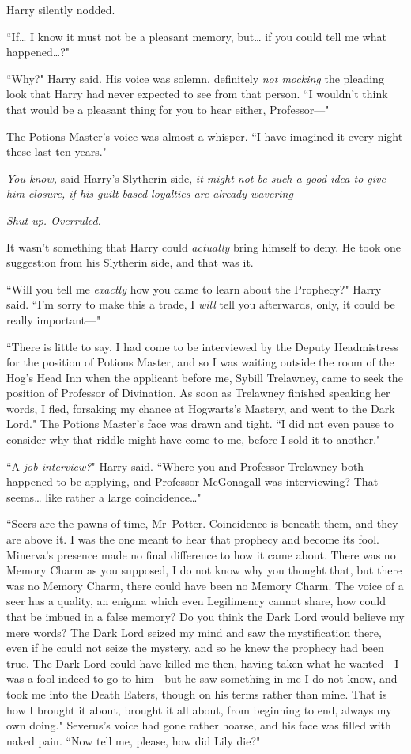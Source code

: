 Harry silently nodded.

``If{\ldots} I know it must not be a pleasant memory, but{\ldots} if you could tell me what happened{\ldots}?"

``Why?" Harry said. His voice was solemn, definitely \emph{not mocking} the pleading look that Harry had never expected to see from that person. ``I wouldn't think that would be a pleasant thing for you to hear either, Professor—"

The Potions Master's voice was almost a whisper. ``I have imagined it every night these last ten years."

\emph{You know,} said Harry's Slytherin side, \emph{it might not be such a good idea to give him closure, if his guilt-based loyalties are already wavering—}

\emph{Shut up. Overruled.}

It wasn't something that Harry could \emph{actually} bring himself to deny. He took one suggestion from his Slytherin side, and that was it.

``Will you tell me \emph{exactly} how you came to learn about the Prophecy?" Harry said. ``I'm sorry to make this a trade, I \emph{will} tell you afterwards, only, it could be really important—"

``There is little to say. I had come to be interviewed by the Deputy Headmistress for the position of Potions Master, and so I was waiting outside the room of the Hog's Head Inn when the applicant before me, Sybill Trelawney, came to seek the position of Professor of Divination. As soon as Trelawney finished speaking her words, I fled, forsaking my chance at Hogwarts's Mastery, and went to the Dark Lord." The Potions Master's face was drawn and tight. ``I did not even pause to consider why that riddle might have come to me, before I sold it to another."

``A \emph{job interview?}" Harry said. ``Where you and Professor Trelawney both happened to be applying, and Professor McGonagall was interviewing? That seems{\ldots} like rather a large coincidence{\ldots}"

``Seers are the pawns of time, Mr~Potter. Coincidence is beneath them, and they are above it. I was the one meant to hear that prophecy and become its fool. Minerva's presence made no final difference to how it came about. There was no Memory Charm as you supposed, I do not know why you thought that, but there was no Memory Charm, there could have been no Memory Charm. The voice of a seer has a quality, an enigma which even Legilimency cannot share, how could that be imbued in a false memory? Do you think the Dark Lord would believe my mere words? The Dark Lord seized my mind and saw the mystification there, even if he could not seize the mystery, and so he knew the prophecy had been true. The Dark Lord could have killed me then, having taken what he wanted—I was a fool indeed to go to him—but he saw something in me I do not know, and took me into the Death Eaters, though on his terms rather than mine. That is how I brought it about, brought it all about, from beginning to end, always my own doing." Severus's voice had gone rather hoarse, and his face was filled with naked pain. ``Now tell me, please, how did Lily die?"

